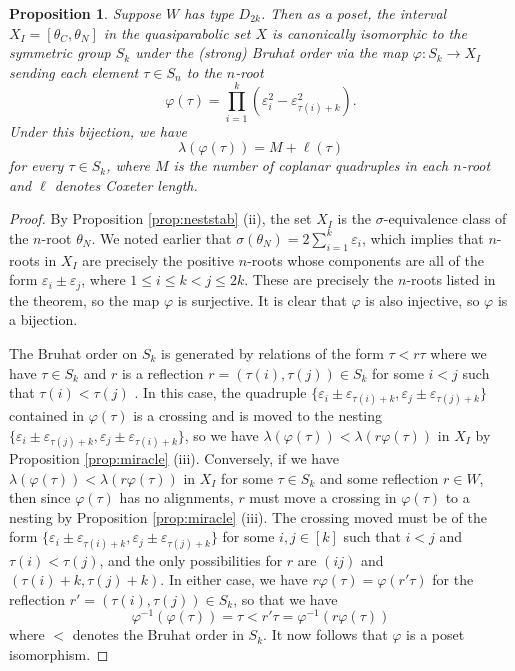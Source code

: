 \documentclass[11pt]{amsart}
\theoremstyle{plain}
\newtheorem{prop}[theorem]{Proposition}
\theoremstyle{definition}
\theoremstyle{remark}
\numberwithin{equation}{subsection}
\newcommand{\ep}{\varepsilon}
\newcommand{\ra}{\rightarrow}
\newcommand{\inverse}{^{-1}}
\begin{document}
\begin{prop}\label{prop:abruhat}
Suppose $W$ has type $D_{2k}$. Then as a poset, the interval $X_I = [\theta_C,
\theta_N]$ in the quasiparabolic set $X$ is canonically isomorphic to the
symmetric group $S_k$ under the (strong) Bruhat order via the map $\varphi: S_k
\ra X_I$ sending each element $\tau\in S_n$ to the $n$-root
\begin{equation}\label{eq:bruhat}\varphi(\tau)=\prod_{i = 1}^k (\ep_i^2 -
      \ep_{\tau(i) + k}^2).
  \end{equation} Under this bijection, we have \[
    \lambda(\varphi(\tau))=M+\ell(\tau) \] for every $\tau\in S_k$, where $M$ is
    the number of coplanar quadruples in each $n$-root and $\ell$ denotes Coxeter
    length.
\end{prop}

\begin{proof}
By Proposition \ref{prop:neststab} (ii), the set $X_I$ is the
$\sigma$-equivalence class of the $n$-root $\theta_N$. We noted earlier that
$\sigma(\theta_N)=2\sum_{i = 1}^k \ep_i$, which implies that $n$-roots in $X_I$
are precisely the positive $n$-roots whose components are all of the form $\ep_i
\pm \ep_j$, where $1 \leq i \leq k < j \leq 2k$. These are  precisely the
$n$-roots listed in the theorem, so the map $\varphi$ is surjective.  It is
clear that $\varphi$ is also injective, so $\varphi$ is a bijection.

The Bruhat order on $S_k$ is generated by relations of the form $\tau< r\tau$
where we have $\tau\in S_k$ and $r$ is a reflection $r=(\tau(i),\tau(j))\in S_k$
for some $i<j$ such that $\tau(i)<\tau(j)$ \cite[Section 5.9, Example
2]{humphreys90}. In this case, the quadruple $\{\ep_i\pm\ep_{\tau(i)+k},
\ep_j\pm\ep_{\tau(j)+k}\}$ contained in $\varphi(\tau)$ is a crossing and is
moved to the nesting $\{\ep_i\pm\ep_{\tau(j)+k}, \ep_j\pm\ep_{\tau(i)+k}\}$, so
we have $\lambda(\varphi(\tau))<\lambda(r\varphi(\tau))$ in $X_I$ by Proposition
\ref{prop:miracle} (iii).  Conversely, if we have
$\lambda(\varphi(\tau))<\lambda(r\varphi(\tau))$ in $X_I$ for some $\tau\in S_k$
and some reflection $r\in W$, then since $\varphi(\tau)$ has no alignments, $r$
must move a crossing in $\varphi(\tau)$ to a nesting by Proposition
\ref{prop:miracle} (iii). The crossing moved must be of the form
$\{\ep_i\pm\ep_{\tau(i)+k}, \ep_j\pm\ep_{\tau(j)+k}\}$ for some $i,j\in [k]$
such that $i<j$ and $\tau(i)<\tau(j)$, and the only possibilities for $r$ are
$(ij)$ and $(\tau(i)+k,\tau(j)+k)$. In either case, we have
$r\varphi(\tau)=\varphi(r'\tau)$ for the reflection $r'=(\tau(i),\tau(j))\in
S_k$, so that we have
\[\varphi\inverse(\varphi(\tau))=\tau<r'\tau=\varphi\inverse(r\varphi(\tau))\]
where $<$ denotes the Bruhat order in $S_k$.  It now follows that $\varphi$ is a
poset isomorphism.


\end{proof}
\end{document}
